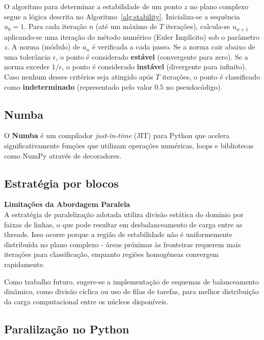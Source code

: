 \documentclass[a4paper,12pt]{article}
\begin{document}
O algoritmo para determinar a estabilidade de um ponto \( z \) no plano complexo segue a lógica descrita no Algoritmo~\ref{alg:stability}. Inicializa-se a sequência \( u_0 = 1 \). Para cada iteração \( n \) (até um máximo de \( T \) iterações), calcula-se \( u_{n+1} \) aplicando-se uma iteração do método numérico (Euler Implícito) sob o parâmetro \( z \). A norma (módulo) de \( u_n \) é verificada a cada passo. Se a norma cair abaixo de uma tolerância \( \epsilon \), o ponto é considerado \textbf{estável} (convergente para zero). Se a norma exceder \( 1/\epsilon \), o ponto é considerado \textbf{instável} (divergente para infinito). Caso nenhum desses critérios seja atingido após \( T \) iterações, o ponto é classificado como \textbf{indeterminado} (representado pelo valor \( 0.5 \) no pseudocódigo).


\subsection{Numba}
O \textbf{Numba} é um compilador \textit{just-in-time} (JIT) para Python que acelera significativamente funções que utilizam operações numéricas, loops e bibliotecas como NumPy através de decoradores.

\subsection{Estratégia por blocos}

\textbf{Limitações da Abordagem Paralela} \\

A estratégia de paralelização adotada utiliza divisão estática do domínio por faixas de linhas, o que pode resultar em desbalanceamento de carga entre as threads. Isso ocorre porque a região de estabilidade não é uniformemente distribuída no plano complexo - áreas próximas às fronteiras requerem mais iterações para classificação, enquanto regiões homogêneas convergem rapidamente.

Como trabalho futuro, sugere-se a implementação de esquemas de balanceamento dinâmico, como divisão cíclica ou uso de filas de tarefas, para melhor distribuição da carga computacional entre os núcleos disponíveis.

\subsection{Paralilzação no Python}
\end{document}

